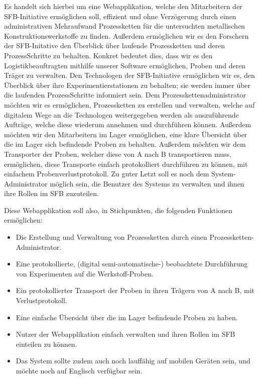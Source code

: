 \documentclass[enabledeprecatedfontcommands,fontsize=12pt,paper=a4,twoside]{scrartcl}
\begin{document}
Es handelt sich hierbei um eine Webapplikation, welche den Mitarbeitern der SFB-Initiative ermöglichen soll, effizient und ohne Verzögerung durch einen administrativen Mehraufwand Prozessketten für die untersuchten metallischen Konstruktionswerkstoffe zu finden. 
Außerdem ermöglichen wir es den Forschern der SFB-Initative den Überblick über laufende Prozessketten und deren ProzessSchritte zu behalten.
Konkret bedeutet dies, dass wir es den Logistikbeauftragten mithilfe unserer Software ermöglichen, Proben und deren Träger zu verwalten. Den Technologen der SFB-Initiative ermöglichen wir es, den Überblick über ihre Experimentierstationen zu behalten; sie werden immer über die laufenden ProzessSchritte informiert sein.
Dem Prozesskettenadministrator möchten wir es ermöglichen, Prozessketten zu erstellen und verwalten, welche auf digitalem Wege an die Technologen weitergegeben werden als auszuführende Aufträge, welche diese wiederum annehmen und durchführen können.
Außerdem möchten wir den Mitarbeitern im Lager ermöglichen, eine klare Übersicht über die im Lager sich befindende Proben zu behalten.
Außerdem möchten wir dem Transporter der Proben, welcher diese von A nach B transportieren muss, ermöglichen, diese Transporte einfach protokolliert durchführen zu können, mit einfachem Probenverlustprotokoll. 
Zu guter Letzt soll es noch dem System-Administrator möglich sein, die Benutzer des Systems zu verwalten und ihnen ihre Rollen im SFB zuzuteilen.
 
Diese Webapplikation soll also, in Stichpunkten, die folgenden Funktionen ermöglichen:
\begin{itemize}
  \item Die Erstellung und Verwaltung von Prozessketten durch einen Prozessketten-Administrator.
  \item Eine protokollierte, (digital semi-automatische-) beobachtete Durchführung von Experimenten auf die Werkstoff-Proben. 
  \item Ein protokollierter Transport der Proben in ihren Trägern von A nach B, mit Verlustprotokoll.
  \item Eine einfache Übersicht über die im Lager befindende Proben zu haben.
  \item Nutzer der Webapplikation einfach verwalten und ihren Rollen im SFB einteilen zu können.
  \item Das System sollte zudem auch noch lauffähig auf mobilen Geräten sein, und möchte noch auf Englisch verfügbar sein.
\end{itemize}
\end{document}
